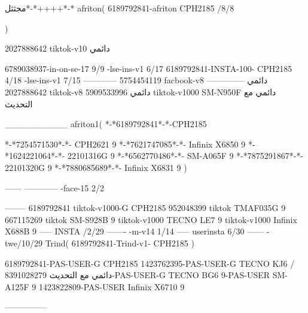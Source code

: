 مجثثل*-*++++*-*
afriton(
6189792841-afriton CPH2185  /8/8

)

2027888642 tiktok-v10
دائمي

6789038937-in-on-se-17 9/9
-lse-ins-v1 6/17
6189792841-INSTA-100- CPH2185 4/18
-lse-ins-v1 7/15
------------
5754454119 facbook-v8
دائمي
--------------
2027888642 tiktok-v8
دائمي
5909533996 tiktok-v1000  SM-N950F
دائمي مع التحديث

__________
afriton1(
*-*6189792841*-*-CPH2185

*-*7254571530*-*- CPH2621   9\6
*-*7621747085*-*- Infinix X6850   9\6
*-*1624221064*-*- 22101316G   9\9
*-*6562770486*-*- SM-A065F   9
*-*7875291867*-*- 22101320G   9\7
*-*7880685689*-*- Infinix X6831   9
)


------
------------
-face-15 2/2

--------
6189792841 tiktok-v1000-G CPH2185 
952048399 tiktok TMAF035G 9
667115269 tiktok  SM-S928B  9 tiktok-v1000  TECNO LE7  9 tiktok-v1000  Infinix X688B  9
-----
 INSTA /2/29
-------
-m-v14 1/14
-----
userinsta 6/30
------
-twe/10/29
Trind(
6189792841-Trind-v1- CPH2185 
)


6189792841-PAS-USER-G CPH2185 
1423762395-PAS-USER-G TECNO KJ6  /دائمي مع التحديث
8391028279-PAS-USER-G  TECNO BG6  9-PAS-USER  SM-A125F  9
1423822809-PAS-USER   Infinix X6710  9

    ---------------

